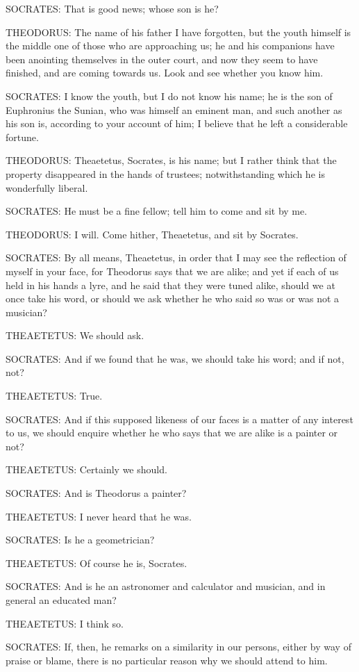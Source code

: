 SOCRATES: That is good news; whose son is he?

THEODORUS: The name of his father I have forgotten, but the youth
himself is the middle one of those who are approaching us; he and his
companions have been anointing themselves in the outer court, and now
they seem to have finished, and are coming towards us. Look and see
whether you know him.

SOCRATES: I know the youth, but I do not know his name; he is the son of
Euphronius the Sunian, who was himself an eminent man, and such another
as his son is, according to your account of him; I believe that he left
a considerable fortune.

THEODORUS: Theaetetus, Socrates, is his name; but I rather think that
the property disappeared in the hands of trustees; notwithstanding which
he is wonderfully liberal.

SOCRATES: He must be a fine fellow; tell him to come and sit by me.

THEODORUS: I will. Come hither, Theaetetus, and sit by Socrates.

SOCRATES: By all means, Theaetetus, in order that I may see the
reflection of myself in your face, for Theodorus says that we are alike;
and yet if each of us held in his hands a lyre, and he said that they
were tuned alike, should we at once take his word, or should we ask
whether he who said so was or was not a musician?

THEAETETUS: We should ask.

SOCRATES: And if we found that he was, we should take his word; and if
not, not?

THEAETETUS: True.

SOCRATES: And if this supposed likeness of our faces is a matter of any
interest to us, we should enquire whether he who says that we are alike
is a painter or not?

THEAETETUS: Certainly we should.

SOCRATES: And is Theodorus a painter?

THEAETETUS: I never heard that he was.

SOCRATES: Is he a geometrician?

THEAETETUS: Of course he is, Socrates.

SOCRATES: And is he an astronomer and calculator and musician, and in
general an educated man?

THEAETETUS: I think so.

SOCRATES: If, then, he remarks on a similarity in our persons, either
by way of praise or blame, there is no particular reason why we should
attend to him.

